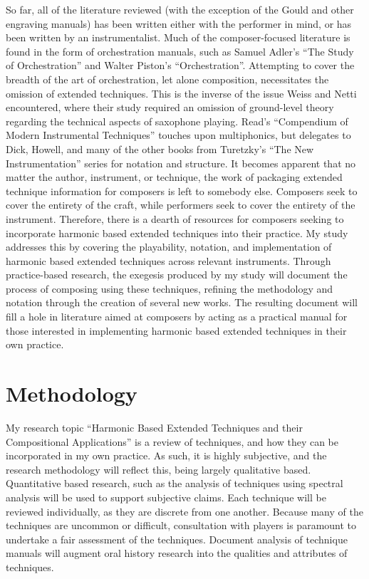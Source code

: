 So far, all of the literature reviewed (with the exception of the Gould and other engraving manuals) has been written either with the performer in mind, or has been written by an instrumentalist. Much of the composer-focused literature is found in the form of orchestration manuals, such as Samuel Adler’s “The Study of Orchestration” and Walter Piston’s “Orchestration”.\autocite{adlerStudyOrchestration2002, pistonOrchestration1969}  Attempting to cover the breadth of the art of orchestration, let alone composition, necessitates the omission of extended techniques. This is the inverse of the issue Weiss and Netti encountered, where their study required an omission of ground-level theory regarding the technical aspects of saxophone playing. Read’s “Compendium of Modern Instrumental Techniques” touches upon multiphonics, but delegates to Dick, Howell, and many of the other books from Turetzky’s “The New Instrumentation” series for notation and structure.\autocite[160]{readCompendiumModernInstrumental1993}  It becomes apparent that no matter the author, instrument, or technique, the work of packaging extended technique information for composers is left to somebody else. Composers seek to cover the entirety of the craft, while performers seek to cover the entirety of the instrument. Therefore, there is a dearth of resources for composers seeking to incorporate harmonic based extended techniques into their practice. My study addresses this by covering the playability, notation, and implementation of harmonic based extended techniques across relevant instruments. Through practice-based research, the exegesis produced by my study will document the process of composing using these techniques, refining the methodology and notation through the creation of several new works. The resulting document will fill a hole in literature aimed at composers by acting as a practical manual for those interested in implementing harmonic based extended techniques in their own practice.


\newpage

\section{Methodology}
My research topic “Harmonic Based Extended Techniques and their Compositional Applications” is a review of techniques, and how they can be incorporated in my own practice. As such, it is highly subjective, and the research methodology will reflect this, being largely qualitative based. Quantitative based research, such as the analysis of techniques using spectral analysis will be used to support subjective claims. Each technique will be reviewed individually, as they are discrete from one another. Because many of the techniques are uncommon or difficult, consultation with players is paramount to undertake a fair assessment of the techniques. Document analysis of technique manuals will augment oral history research into the qualities and attributes of techniques.

